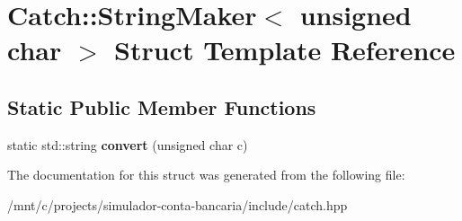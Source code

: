 \hypertarget{structCatch_1_1StringMaker_3_01unsigned_01char_01_4}{}\section{Catch\+:\+:String\+Maker$<$ unsigned char $>$ Struct Template Reference}
\label{structCatch_1_1StringMaker_3_01unsigned_01char_01_4}
\subsection*{Static Public Member Functions}
\begin{DoxyCompactItemize}
\item 
\mbox{\label{structCatch_1_1StringMaker_3_01unsigned_01char_01_4_a7cddb1df26275b9a8e631466eb122f59}} 
static std\+::string {\bfseries convert} (unsigned char c)
\end{DoxyCompactItemize}


The documentation for this struct was generated from the following file\+:\begin{DoxyCompactItemize}
\item 
/mnt/c/projects/simulador-\/conta-\/bancaria/include/catch.\+hpp\end{DoxyCompactItemize}
